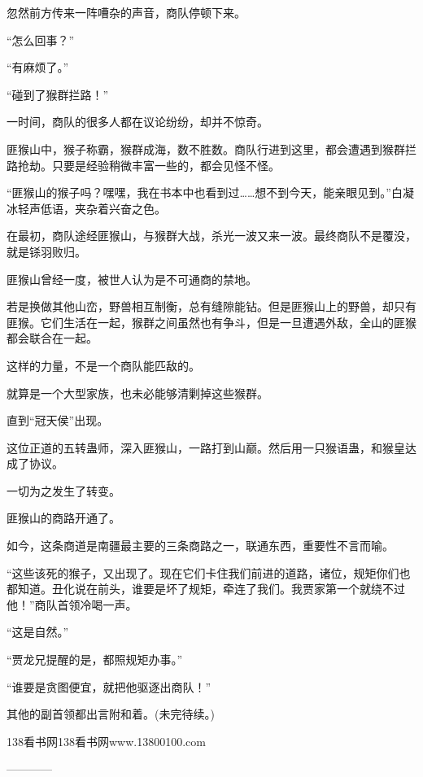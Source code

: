 \begin{this_body}
忽然前方传来一阵嘈杂的声音，商队停顿下来。

“怎么回事？”

“有麻烦了。”

“碰到了猴群拦路！”

一时间，商队的很多人都在议论纷纷，却并不惊奇。

匪猴山中，猴子称霸，猴群成海，数不胜数。商队行进到这里，都会遭遇到猴群拦路抢劫。只要是经验稍微丰富一些的，都会见怪不怪。

“匪猴山的猴子吗？嘿嘿，我在书本中也看到过……想不到今天，能亲眼见到。”白凝冰轻声低语，夹杂着兴奋之色。

在最初，商队途经匪猴山，与猴群大战，杀光一波又来一波。最终商队不是覆没，就是铩羽败归。

匪猴山曾经一度，被世人认为是不可通商的禁地。

若是换做其他山峦，野兽相互制衡，总有缝隙能钻。但是匪猴山上的野兽，却只有匪猴。它们生活在一起，猴群之间虽然也有争斗，但是一旦遭遇外敌，全山的匪猴都会联合在一起。

这样的力量，不是一个商队能匹敌的。

就算是一个大型家族，也未必能够清剿掉这些猴群。

直到“冠天侯”出现。

这位正道的五转蛊师，深入匪猴山，一路打到山巅。然后用一只猴语蛊，和猴皇达成了协议。

一切为之发生了转变。

匪猴山的商路开通了。

如今，这条商道是南疆最主要的三条商路之一，联通东西，重要性不言而喻。

“这些该死的猴子，又出现了。现在它们卡住我们前进的道路，诸位，规矩你们也都知道。丑化说在前头，谁要是坏了规矩，牵连了我们。我贾家第一个就绕不过他！”商队首领冷喝一声。

“这是自然。”

“贾龙兄提醒的是，都照规矩办事。”

“谁要是贪图便宜，就把他驱逐出商队！”

其他的副首领都出言附和着。(未完待续。)

138看书网138看书网www.13800100.com

------------

\end{this_body}


